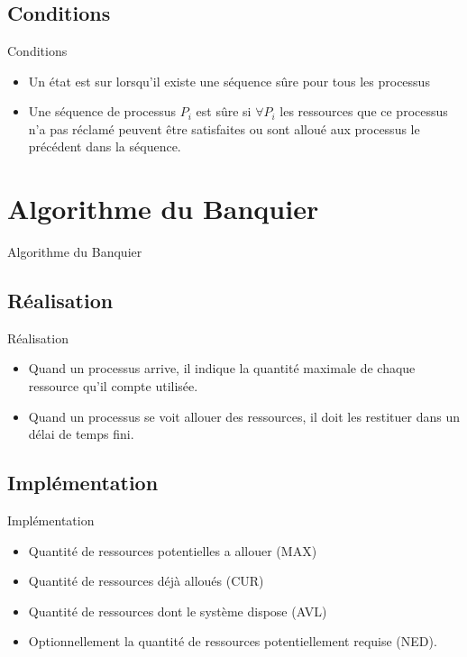 \section{\sectitle}
\begin{frame}{\sectitle}
    \def\subsectitle{Conditions}
    \subsection{\subsectitle}
    \begin{block}{\subsectitle}
        \begin{itemize}
            \item Un état est sur lorsqu'il existe une séquence sûre pour tous les
                processus
            \item Une séquence de processus $P_{i}$ est sûre si $\forall P_{i}$ les
                ressources que ce processus n'a pas réclamé peuvent être satisfaites ou sont
                alloué aux processus le précédent dans la séquence.
        \end{itemize}
    \end{block}
\end{frame}

\def\sectitle{Algorithme du Banquier}
\section{\sectitle}
\begin{frame}{\sectitle}
    \def\subsectitle{Réalisation}
    \subsection{\subsectitle}
    \begin{block}{\subsectitle}
        \begin{itemize}
            \item Quand un processus arrive, il indique la quantité maximale de chaque
                ressource qu'il compte utilisée.
            \item Quand un processus se voit allouer des ressources, il doit les
                restituer dans un délai de temps fini.
        \end{itemize}
    \end{block}
    \def\subsectitle{Implémentation}
    \subsection{\subsectitle}
    \begin{block}{\subsectitle}
        \begin{itemize}
            \item Quantité de ressources potentielles a allouer (MAX)
            \item Quantité de ressources déjà alloués (CUR)
            \item Quantité de ressources dont le système dispose (AVL)
            \item Optionnellement la quantité de ressources potentiellement requise (NED).
        \end{itemize}
    \end{block}
\end{frame}

